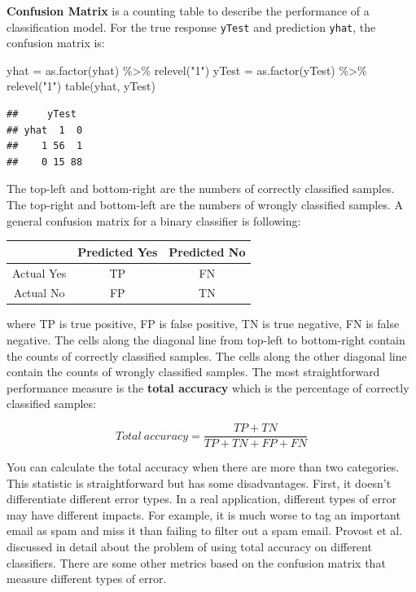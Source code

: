 \documentclass[
  12pt,
]{krantz}
\makeatletter
\newenvironment{Shaded}{\begin{snugshade}}{\end{snugshade}}
\newcommand{\FunctionTok}[1]{\textcolor[rgb]{0,0,0}{#1}}
\newcommand{\NormalTok}[1]{#1}
\newcommand{\OtherTok}[1]{\textcolor[rgb]{0.37,0.37,0.37}{#1}}
\newcommand{\SpecialCharTok}[1]{\textcolor[rgb]{0,0,0}{#1}}
\newcommand{\StringTok}[1]{\textcolor[rgb]{0.5,0.5,0.5}{#1}}
\newenvironment{kframe}{%
\medskip{}
\setlength{\fboxsep}{.8em}
 \def\at@end@of@kframe{}%
 \ifinner\ifhmode%
  \def\at@end@of@kframe{\end{minipage}}%
  \begin{minipage}{\columnwidth}%
 \fi\fi%
 \def\FrameCommand##1{\hskip\@totalleftmargin \hskip-\fboxsep
 \colorbox{shadecolor}{##1}\hskip-\fboxsep
     \hskip-\linewidth \hskip-\@totalleftmargin \hskip\columnwidth}%
 \MakeFramed {\advance\hsize-\width
   \@totalleftmargin\z@ \linewidth\hsize
   \@setminipage}}%
 {\par\unskip\endMakeFramed%
 \at@end@of@kframe}
\renewenvironment{Shaded}{\begin{kframe}}{\end{kframe}}
\makeatother
\begin{document}
\textbf{Confusion Matrix} is a counting table to describe the performance of a classification model. For the true response \texttt{yTest} and prediction \texttt{yhat}, the confusion matrix is:

\begin{Shaded}
\begin{Highlighting}[]
\NormalTok{yhat }\OtherTok{=} \FunctionTok{as.factor}\NormalTok{(yhat) }\SpecialCharTok{\%\textgreater{}\%} \FunctionTok{relevel}\NormalTok{(}\StringTok{"1"}\NormalTok{)}
\NormalTok{yTest }\OtherTok{=} \FunctionTok{as.factor}\NormalTok{(yTest) }\SpecialCharTok{\%\textgreater{}\%} \FunctionTok{relevel}\NormalTok{(}\StringTok{"1"}\NormalTok{)}
\FunctionTok{table}\NormalTok{(yhat, yTest)}
\end{Highlighting}
\end{Shaded}

\begin{verbatim}
##     yTest
## yhat  1  0
##    1 56  1
##    0 15 88
\end{verbatim}

The top-left and bottom-right are the numbers of correctly classified samples. The top-right and bottom-left are the numbers of wrongly classified samples. A general confusion matrix for a binary classifier is following:

\begin{longtable}[]{@{}ccc@{}}
\toprule
& Predicted Yes & Predicted No \\
\midrule
\endhead
Actual Yes & TP & FN \\
Actual No & FP & TN \\
\bottomrule
\end{longtable}

where TP is true positive, FP is false positive, TN is true negative, FN is false negative. The cells along the diagonal line from top-left to bottom-right contain the counts of correctly classified samples. The cells along the other diagonal line contain the counts of wrongly classified samples. The most straightforward performance measure is the \textbf{total accuracy} which is the percentage of correctly classified samples:

\[Total\ accuracy = \frac{TP+TN}{TP+TN+FP+FN}\]

You can calculate the total accuracy when there are more than two categories. This statistic is straightforward but has some disadvantages. First, it doesn't differentiate different error types. In a real application, different types of error may have different impacts. For example, it is much worse to tag an important email as spam and miss it than failing to filter out a spam email. Provost et al. \citep{Provost1998} discussed in detail about the problem of using total accuracy on different classifiers. There are some other metrics based on the confusion matrix that measure different types of error.
\end{document}
